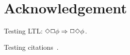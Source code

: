 
\section{Acknowledgement}
\label{sec:Acknowledgement}


Testing LTL: $\Diamond\Box\phi \Rightarrow \Box\Diamond\phi$.

Testing citations~\cite{Engelhardt2013, MannaPnueli1991:szym,
  HoangAbrial:ICFEM2011, MannaPnueli92, MannaPnueli:REX1988}.
